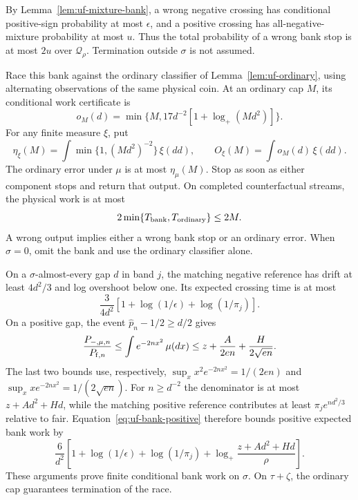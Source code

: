 By Lemma~\ref{lem:uf-mixture-bank}, a wrong negative crossing has
conditional positive-sign probability at most $\epsilon$, and a positive
crossing has all-negative-mixture probability at most $u$. Thus the total
probability of a wrong bank stop is at most $2u$ over $\mathcal Q_\rho$.
Termination outside $\sigma$ is not assumed.

Race this bank against the ordinary classifier of Lemma~\ref{lem:uf-ordinary}, using
alternating observations of the same physical coin. At an ordinary cap
$M$, its conditional work certificate is
\[
 o_M(d)=\min\{M,17d^{-2}[1+\log_+(Md^2)]\}.
\]
For any finite measure $\xi$, put
\[
 \eta_\xi(M)=\int\min\{1,(Md^2)^{-2}\}\,\xi(dd),\qquad
 O_\xi(M)=\int o_M(d)\,\xi(dd).
\]
The ordinary error under $\mu$ is at most $\eta_\mu(M)$.
Stop as soon as either component stops and return that output.
On completed counterfactual streams, the physical work is at most
\[
 2\min\{T_{\rm bank},T_{\rm ordinary}\}\le2M.
\]
A wrong output implies either a wrong bank stop or an ordinary error.
When $\sigma=0$, omit the bank and use the ordinary classifier alone.

On a $\sigma$-almost-every gap $d$ in band $j$, the matching negative
reference has drift at least $4d^2/3$ and log overshoot below one.
Its expected crossing time is at most
\begin{equation}\label{eq:split-negative-work}
 \frac3{4d^2}[1+\log(1/\epsilon)+\log(1/\pi_j)].
\end{equation}
On a positive gap, the event $\widehat p_n-1/2\ge d/2$ gives
\begin{equation}\label{eq:split-null-laplace}
 \frac{P_{-,\mu,n}}{P_{{\rm f},n}}
 \le\int e^{-2nx^2}\,\mu(dx)
 \le z+\frac A{2en}+\frac H{2\sqrt{en}}.
\end{equation}
The last two bounds use, respectively,
$\sup_xx^2e^{-2nx^2}=1/(2en)$ and
$\sup_xxe^{-2nx^2}=1/(2\sqrt{en})$.
For $n\ge d^{-2}$ the denominator is at most $z+Ad^2+Hd$,
while the matching positive reference contributes at least
$\pi_je^{nd^2/3}$ relative to fair. Equation~\eqref{eq:uf-bank-positive} therefore bounds positive expected bank work by
\begin{equation}\label{eq:split-positive-work}
 \frac6{d^2}\left[
 1+\log(1/\epsilon)+\log(1/\pi_j)
 +\log_+\frac{z+Ad^2+Hd}{\rho}\right].
\end{equation}
These arguments prove finite conditional bank work on $\sigma$.
On $\tau+\zeta$, the ordinary cap guarantees termination of the race.

